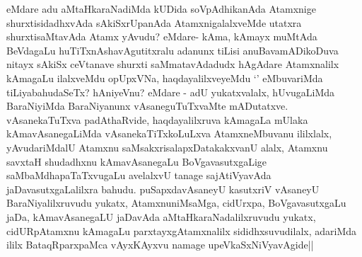 \begin{artha}
eMdare adu aMtaHkaraNadiMda kUDida soVpAdhikanAda Atamxnige shurxtisidadhxvAda sAkiSxrUpanAda AtamxnigalalxveMde utatxra shurxtisaMtavAda Atamx yAvudu? eMdare- kAma, kAmayx muMtAda BeVdagaLu huTiTxnAshavAgutitxralu adanunx tiLisi anuBavamADikoDuva nitayx sAkiSx ceVtanave  shurxti saMmatavAdadudx hAgAdare Atamxnalilx kAmagaLu ilalxveMdu opUpxVNa, haqdayalilxveyeMdu `\stext' eMbuvariMda tiLiyabahudaSeTx? hAniyeVnu? eMdare - adU yukatxvalalx, hUvugaLiMda BaraNiyiMda BaraNiyanunx vAsaneguTuTxvaMte mADutatxve. vAsanekaTuTxva padAthaRvide, haqdayalilxruva kAmagaLa mUlaka kAmavAsanegaLiMda vAsanekaTiTxkoLuLxva AtamxneMbuvanu ililxlalx, yAvudariMdalU Atamxnu saMsakxrisalapxDatakakxvanU alalx, Atamxnu savxtaH shudadhxnu kAmavAsanegaLu BoVgavasutxgaLige saMbaMdhapaTaTxvugaLu avelalxvU tanage sajAtiVyavAda jaDavasutxgaLalilxra bahudu. puSapxdavAsaneyU kasutxriV vAsaneyU BaraNiyalilxruvudu yukatx, AtamxnuniMsaMga, cidUrxpa, BoVgavasutxgaLu jaDa, kAmavAsanegaLU jaDavAda aMtaHkaraNadalilxruvudu yukatx, cidURpAtamxnu kAmagaLu parxtayxgAtamxnalilx sididhxsuvudilalx, adariMda ililx BataqRparxpaMca vAyxKAyxvu namage upeVkaSxNiVyavAgide||
\end{artha}

